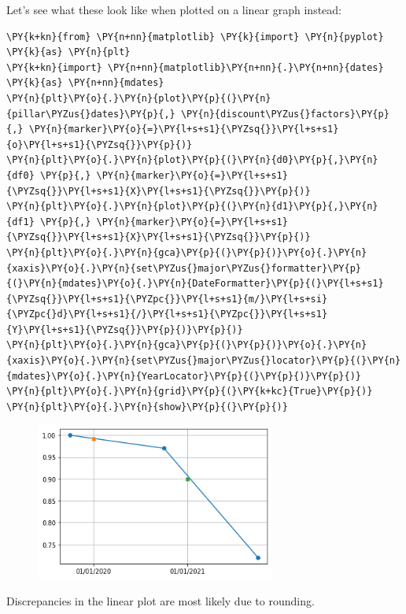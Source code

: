Let's see what these look like when plotted on a linear graph instead:
    
\begin{tcolorbox}[breakable, size=fbox, boxrule=1pt, pad at break*=1mm,colback=cellbackground, colframe=cellborder]
\begin{Verbatim}[commandchars=\\\{\}]
\PY{k+kn}{from} \PY{n+nn}{matplotlib} \PY{k}{import} \PY{n}{pyplot} \PY{k}{as} \PY{n}{plt}
\PY{k+kn}{import} \PY{n+nn}{matplotlib}\PY{n+nn}{.}\PY{n+nn}{dates} \PY{k}{as} \PY{n+nn}{mdates}
\PY{n}{plt}\PY{o}{.}\PY{n}{plot}\PY{p}{(}\PY{n}{pillar\PYZus{}dates}\PY{p}{,} \PY{n}{discount\PYZus{}factors}\PY{p}{,} \PY{n}{marker}\PY{o}{=}\PY{l+s+s1}{\PYZsq{}}\PY{l+s+s1}{o}\PY{l+s+s1}{\PYZsq{}}\PY{p}{)}
\PY{n}{plt}\PY{o}{.}\PY{n}{plot}\PY{p}{(}\PY{n}{d0}\PY{p}{,}\PY{n}{df0} \PY{p}{,} \PY{n}{marker}\PY{o}{=}\PY{l+s+s1}{\PYZsq{}}\PY{l+s+s1}{X}\PY{l+s+s1}{\PYZsq{}}\PY{p}{)}
\PY{n}{plt}\PY{o}{.}\PY{n}{plot}\PY{p}{(}\PY{n}{d1}\PY{p}{,}\PY{n}{df1} \PY{p}{,} \PY{n}{marker}\PY{o}{=}\PY{l+s+s1}{\PYZsq{}}\PY{l+s+s1}{X}\PY{l+s+s1}{\PYZsq{}}\PY{p}{)}
\PY{n}{plt}\PY{o}{.}\PY{n}{gca}\PY{p}{(}\PY{p}{)}\PY{o}{.}\PY{n}{xaxis}\PY{o}{.}\PY{n}{set\PYZus{}major\PYZus{}formatter}\PY{p}{(}\PY{n}{mdates}\PY{o}{.}\PY{n}{DateFormatter}\PY{p}{(}\PY{l+s+s1}{\PYZsq{}}\PY{l+s+s1}{\PYZpc{}}\PY{l+s+s1}{m/}\PY{l+s+si}{\PYZpc{}d}\PY{l+s+s1}{/}\PY{l+s+s1}{\PYZpc{}}\PY{l+s+s1}{Y}\PY{l+s+s1}{\PYZsq{}}\PY{p}{)}\PY{p}{)}
\PY{n}{plt}\PY{o}{.}\PY{n}{gca}\PY{p}{(}\PY{p}{)}\PY{o}{.}\PY{n}{xaxis}\PY{o}{.}\PY{n}{set\PYZus{}major\PYZus{}locator}\PY{p}{(}\PY{n}{mdates}\PY{o}{.}\PY{n}{YearLocator}\PY{p}{(}\PY{p}{)}\PY{p}{)}
\PY{n}{plt}\PY{o}{.}\PY{n}{grid}\PY{p}{(}\PY{k+kc}{True}\PY{p}{)}
\PY{n}{plt}\PY{o}{.}\PY{n}{show}\PY{p}{(}\PY{p}{)}
\end{Verbatim}
\end{tcolorbox}
\vfill
\begin{figure}[h]
  \centering
  \includegraphics[width=0.7\textwidth]{figures/lecture_3_16_0.png}
\end{figure}
Discrepancies in the linear plot are most likely due to rounding.

